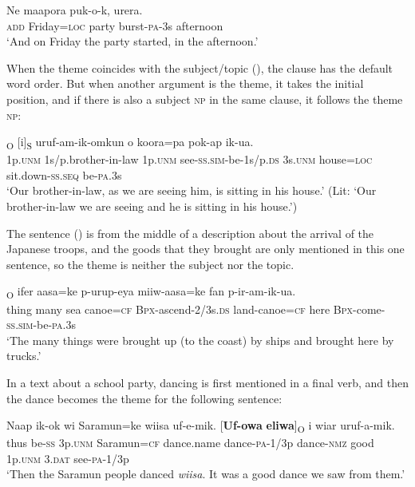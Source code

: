 \ea%
\label{ex:x1698}
\gll Ne    maapora  puk-o-k,  urera.  \\
\textsc{add}  Friday=\textsc{loc}  party  burst-\textsc{pa}-3s  afternoon      \\
\glt`And on Friday the party started, in the afternoon.'
\z


When the theme coincides with the subject/topic (), the clause has the default word order. But when another argument is the theme, it takes the initial position, and if there is also a subject \textsc{np} in the same clause, it follows the theme  \textsc{np}: 

\ea%
\label{ex:x1473}
\textsubscript{O}  [i]\textsubscript{S}  uruf-am-ik-omkun o  koora=pa  pok-ap  ik-ua.\\
1p.\textsc{unm}  1s/p.brother-in-law  1p.\textsc{unm}  see-\textsc{ss}.\textsc{sim}-be-1s/p.\textsc{ds} 3s.\textsc{unm}  house=\textsc{loc}  sit.down-\textsc{ss}.\textsc{seq}  be-\textsc{pa}.3s\\
\glt`Our brother-in-law, as we are seeing him, is sitting in his house.' (Lit: `Our brother-in-law we are seeing and he is sitting in his house.')
\z
{}


The sentence () is from the middle of a description about the arrival of the Japanese troops, and the goods that they brought are only mentioned in this one sentence, so the theme is neither the subject nor the topic. 

\ea%
\label{ex:x1701}
\textsubscript{O}  ifer  aasa=ke  p-urup-eya miiw-aasa=ke  fan  p-ir-am-ik-ua. \\
thing  many  sea  canoe=\textsc{cf}  \textsc{Bpx}-ascend-2/3s.\textsc{ds} land-canoe=\textsc{cf}  here  \textsc{Bpx}-come-\textsc{ss}.\textsc{sim}-be-\textsc{pa}.3s     \\
\glt`The many things were brought up (to the coast) by ships and brought here by trucks.'
\z


In a text about a school party, dancing is first mentioned in a final verb, and then the dance becomes the theme for the following sentence:

\ea%
\label{ex:x1702}
\gll Naap  ik-ok  wi  Saramun=ke  wiisa  uf-e-mik. [\textbf{Uf-owa}  \textbf{eliwa}]\textsubscript{O}  i  wiar  uruf-a-mik. \\
thus  be-\textsc{ss}  3p.\textsc{unm}  Saramun=\textsc{cf}  dance.name  dance-\textsc{pa}-1/3p dance-\textsc{nmz}  good  1p.\textsc{unm}  3.\textsc{dat}  see-\textsc{pa}-1/3p     \\
\glt`Then the Saramun people danced \textit{wiisa}. It was a good dance we saw from them.'
\z


